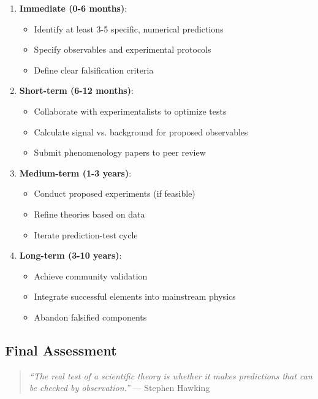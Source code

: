 \begin{enumerate}
    \item \textbf{Immediate (0-6 months)}:
    \begin{itemize}
        \item Identify at least 3-5 specific, numerical predictions
        \item Specify observables and experimental protocols
        \item Define clear falsification criteria
    \end{itemize}

    \item \textbf{Short-term (6-12 months)}:
    \begin{itemize}
        \item Collaborate with experimentalists to optimize tests
        \item Calculate signal vs. background for proposed observables
        \item Submit phenomenology papers to peer review
    \end{itemize}

    \item \textbf{Medium-term (1-3 years)}:
    \begin{itemize}
        \item Conduct proposed experiments (if feasible)
        \item Refine theories based on data
        \item Iterate prediction-test cycle
    \end{itemize}

    \item \textbf{Long-term (3-10 years)}:
    \begin{itemize}
        \item Achieve community validation
        \item Integrate successful elements into mainstream physics
        \item Abandon falsified components
    \end{itemize}
\end{enumerate}

\subsection{Final Assessment}

\begin{quote}
\textit{``The real test of a scientific theory is whether it makes predictions that can be checked by observation.''} --- Stephen Hawking
\end{quote}

